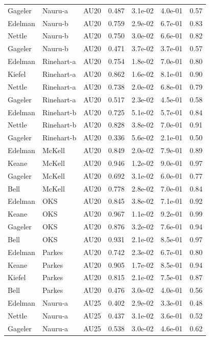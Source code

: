 \documentclass{monashthesis}
\begin{document}
\begin{center}
\begin{longtable}{lllllll}
Gageler & Nauru-a & AU20 & 0.487 & 3.1e-02 & 4.0e-01 & 0.57 \\
Edelman & Nauru-b & AU20 & 0.759 & 2.9e-02 & 6.7e-01 & 0.83 \\
Nettle & Nauru-b & AU20 & 0.750 & 3.0e-02 & 6.6e-01 & 0.82 \\
Gageler & Nauru-b & AU20 & 0.471 & 3.7e-02 & 3.7e-01 & 0.57 \\
Edelman & Rinehart-a & AU20 & 0.754 & 1.8e-02 & 7.0e-01 & 0.80 \\
Kiefel & Rinehart-a & AU20 & 0.862 & 1.6e-02 & 8.1e-01 & 0.90 \\
Nettle & Rinehart-a & AU20 & 0.738 & 2.0e-02 & 6.8e-01 & 0.79 \\
Gageler & Rinehart-a & AU20 & 0.517 & 2.3e-02 & 4.5e-01 & 0.58 \\
Edelman & Rinehart-b & AU20 & 0.725 & 5.1e-02 & 5.7e-01 & 0.84 \\
Nettle & Rinehart-b & AU20 & 0.828 & 3.8e-02 & 7.0e-01 & 0.91 \\
Gageler & Rinehart-b & AU20 & 0.336 & 5.6e-02 & 2.1e-01 & 0.50 \\
Edelman & McKell & AU20 & 0.849 & 2.0e-02 & 7.9e-01 & 0.89 \\
Keane & McKell & AU20 & 0.946 & 1.2e-02 & 9.0e-01 & 0.97 \\
Gageler & McKell & AU20 & 0.692 & 3.1e-02 & 6.0e-01 & 0.77 \\
Bell & McKell & AU20 & 0.778 & 2.8e-02 & 7.0e-01 & 0.84 \\
Edelman & OKS & AU20 & 0.845 & 3.8e-02 & 7.1e-01 & 0.92 \\
Keane & OKS & AU20 & 0.967 & 1.1e-02 & 9.2e-01 & 0.99 \\
Gageler & OKS & AU20 & 0.876 & 3.2e-02 & 7.6e-01 & 0.94 \\
Bell & OKS & AU20 & 0.931 & 2.1e-02 & 8.5e-01 & 0.97 \\
Edelman & Parkes & AU20 & 0.742 & 2.3e-02 & 6.7e-01 & 0.80 \\
Keane & Parkes & AU20 & 0.905 & 1.7e-02 & 8.5e-01 & 0.94 \\
Kiefel & Parkes & AU20 & 0.815 & 2.1e-02 & 7.5e-01 & 0.87 \\
Bell & Parkes & AU20 & 0.476 & 3.0e-02 & 4.0e-01 & 0.56 \\
Edelman & Nauru-a & AU25 & 0.402 & 2.9e-02 & 3.3e-01 & 0.48 \\
Nettle & Nauru-a & AU25 & 0.437 & 3.1e-02 & 3.6e-01 & 0.52 \\
Gageler & Nauru-a & AU25 & 0.538 & 3.0e-02 & 4.6e-01 & 0.62 \\

\end{longtable}
\end{center}
\end{document}
